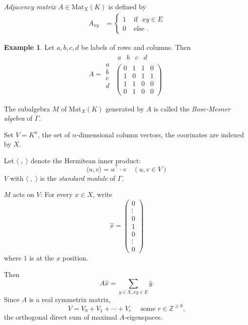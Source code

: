 \documentclass[
]{book}
\theoremstyle{definition}
\theoremstyle{definition}
\newtheorem{example}{Example}[chapter]
\theoremstyle{definition}
\theoremstyle{definition}
\theoremstyle{remark}
\begin{document}
\emph{Adjacency matrix} \(A\in \mathrm{Mat}_X(K)\) is defined by
\begin{align}
A_{xy} & = \left\{\begin{array}{cl} 1 & \textrm{ if } \; xy\in E\\
0 & \textrm{ else } . \end{array}\right.
\end{align}

\begin{example}
Let \(a, b, c, d\) be labels of rows and columns. Then
\[A = \begin{matrix} \\ a\\ b\\c\\d\end{matrix}\begin{matrix}\begin{matrix} a & b & c & d \end{matrix}\\\begin{pmatrix} 0 & 1 & 1 & 0 \\ 1 & 0 & 1 & 1 \\
1 & 1 & 0 & 0 \\ 0 & 1 & 0 & 0 \end{pmatrix}\end{matrix}\]
\end{example}

The subalgebra \(M\) of \(\mathrm{Mat}_X(K)\) generated by \(A\) is called the \emph{Bose-Mesner algebra} of \(\Gamma\).

Set \(V = K^n\), the set of \(n\)-dimensional column vectors, the coorinates are indexed by \(X\).

Let \(\langle\; , \;\rangle\) denote the Hermitean inner product:
\[\langle u, v\rangle = u^\top\cdot v \quad (u, v\in V)\]
\(V\) with \(\langle\; , \;\rangle\) is the \emph{standard module} of \(\Gamma\).

\(M\) acts on \(V\): For every \(x\in X\), write
\[\hat{x} = \begin{pmatrix} 0 \\ \vdots \\ 0 \\ 1 \\ 0 \\ \vdots \\ 0 \end{pmatrix}\]
where \(1\) is at the \(x\) position.

Then
\[A\hat{x} = \sum_{y\in X, xy\in E}\hat{y}.\]
Since \(A\) is a real symmetrix matrix,
\[V = V_0 + V_1 + \cdots + V_r \quad \textrm{ some } r\in \mathbb{Z}^{\geq0},\]
the orthogonal direct sum of maximal \(A\)-eigenspaces.
\end{document}
